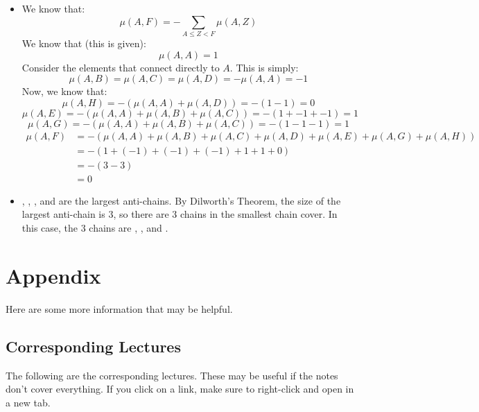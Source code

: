 \documentclass[letterpaper]{article}
\begin{document}
\begin{itemize}
    \item We know that:
    \[\mu(A, F) = -\sum_{A \leq Z < F} \mu(A, Z)\]
    We know that (this is given):
    \[\mu(A, A) = 1\]
    Consider the elements that connect directly to $A$. This is simply: 
    \[\mu(A, B) = \mu(A, C) = \mu(A, D) = -\mu(A, A) = -1\]
    Now, we know that:
    \[\mu(A, H) = -(\mu(A, A) + \mu(A, D)) = -(1 - 1) = 0\]
    \[\mu(A, E) = -(\mu(A, A) + \mu(A, B) + \mu(A, C)) = -(1 + -1 + -1) = 1\]
    \[\mu(A, G) = -(\mu(A, A) + \mu(A, B) + \mu(A, C)) = -(1 - 1 - 1) = 1\]
    \begin{equation*}
        \begin{aligned}
            \mu(A, F) &= -(\mu(A, A) + \mu(A, B) + \mu(A, C) + \mu(A, D) + \mu(A, E) + \mu(A, G) + \mu(A, H)) \\ 
                &= -(1 + (-1) + (-1) + (-1) + 1 + 1 + 0) \\ 
                &= -(3 - 3) \\ 
                &= 0
        \end{aligned}
    \end{equation*}
    \item {}, , , and  are the largest anti-chains. By Dilworth's Theorem, the size of the largest anti-chain is 3, so there are 3 chains in the smallest chain cover. In this case, the 3 chains are , , and . 
\end{itemize}





\newpage 
\section{Appendix}
Here are some more information that may be helpful.

\subsection{Corresponding Lectures}
The following are the corresponding lectures. These may be useful if the notes don't cover everything. If you click on a link, make sure to right-click and open in a new tab. 
\end{document}
